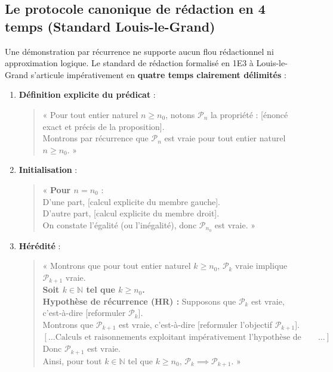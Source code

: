 \documentclass[11pt,a4paper]{article}
\newcommand{\N}{\mathbb{N}}
\begin{document}
\subsection{Le protocole canonique de rédaction en 4 temps (Standard Louis-le-Grand)}

Une démonstration par récurrence ne supporte aucun flou rédactionnel ni approximation logique. Le standard de rédaction formalisé en 1E3 à Louis-le-Grand s'articule impérativement en \textbf{quatre temps clairement délimités} :

\begin{methodebox}
\begin{enumerate}[label=\textbf{\Roman*.}]
    \item \textbf{Définition explicite du prédicat} :
    \begin{quote}
    « Pour tout entier naturel $n \ge n_0$, notons $\mathcal{P}_n$ la propriété : [énoncé exact et précis de la proposition].\\
    Montrons par récurrence que $\mathcal{P}_n$ est vraie pour tout entier naturel $n \ge n_0$. »
    \end{quote}

    \item \textbf{Initialisation} :
    \begin{quote}
    « \textbf{Pour $n = n_0$} :\\
    D'une part, [calcul explicite du membre gauche].\\
    D'autre part, [calcul explicite du membre droit].\\
    On constate l'égalité (ou l'inégalité), donc $\mathcal{P}_{n_0}$ est vraie. »
    \end{quote}

    \item \textbf{Hérédité} :
    \begin{quote}
    « Montrons que pour tout entier naturel $k \ge n_0$, $\mathcal{P}_k$ vraie implique $\mathcal{P}_{k+1}$ vraie.\\
    \textbf{Soit $k \in \N$ tel que $k \ge n_0$.}\\
    \textbf{Hypothèse de récurrence (HR) :} Supposons que $\mathcal{P}_k$ est vraie, c'est-à-dire [reformuler $\mathcal{P}_k$].\\
    Montrons que $\mathcal{P}_{k+1}$ est vraie, c'est-à-dire [reformuler l'objectif $\mathcal{P}_{k+1}$].\\
    $[\dots \text{Calculs et raisonnements exploitant impérativement l'hypothèse de récurrence}\dots]$\\
    Donc $\mathcal{P}_{k+1}$ est vraie.\\
    Ainsi, pour tout $k \in \N$ tel que $k \ge n_0$, $\mathcal{P}_k \implies \mathcal{P}_{k+1}$. »
    \end{quote}


\end{enumerate}
\end{methodebox}
\end{document}
